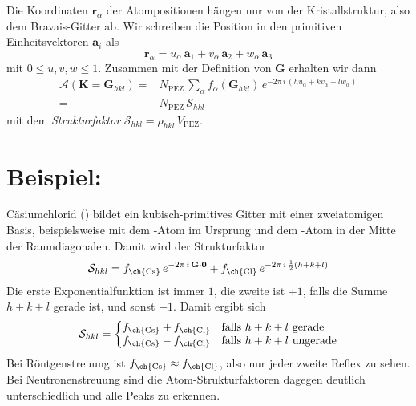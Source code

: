Die Koordinaten  $\mathbf{r}_\alpha$  der Atompositionen hängen nur von der Kristallstruktur, also dem Bravais-Gitter ab. Wir schreiben die Position in den primitiven Einheitsvektoren $\mathbf{a}_i$ als
\begin{equation}
\mathbf{r}_\alpha = u_\alpha \, \mathbf{a}_1 + v_\alpha \, \mathbf{a}_2 + w_\alpha \, \mathbf{a}_3
\end{equation}
mit $0 \le u,v,w \le 1$. Zusammen mit der Definition von  $ \mathbf{G}$ erhalten wir dann 
\begin{align}
\mathcal{A}(\mathbf{K} = \mathbf{G}_{hkl} ) 
 = &
  N_\text{PEZ}  \, 
\sum_\alpha f_\alpha ( \mathbf{G}_{hkl} ) \, e^{-2 \pi \, i \, ( h u_\alpha + k v_\alpha + l w_\alpha  ) } \\
 = &
 N_\text{PEZ} \, \mathcal{S}_{hkl}
\end{align}
mit dem \emph{Strukturfaktor} $\mathcal{S}_{hkl} = \rho_{hkl} \, V_\text{PEZ} $.


\section{Beispiel: }

Cäsiumchlorid  () bildet ein kubisch-primitives Gitter mit einer zweiatomigen Basis, beispielsweise mit dem -Atom im Ursprung und dem -Atom in der Mitte der Raumdiagonalen. Damit wird der Strukturfaktor 
\begin{equation}
\mathcal{S}_{hkl} = f_\text{\ch{Cs}} \, e^{-2 \pi \, i  \, \mathbf{G} \cdot \mathbf{0}} + f_\text{\ch{Cl}} \, e^{- 2 \pi  \, i \, \frac{1}{2}(h + k + l) } 
\end{equation}
Die erste Exponentialfunktion ist immer $1$, die zweite ist $+1$, falls die Summe $h + k + l$ gerade ist, und sonst $-1$. Damit ergibt sich
\begin{equation}
  \mathcal{S}_{hkl} = \left\{
  \begin{array}{@{}ll@{}}
    f_\text{\ch{Cs}}  + f_\text{\ch{Cl}}  &\text{falls}\  h+k+l \ \text{gerade} \\
     f_\text{\ch{Cs}}  - f_\text{\ch{Cl}} & \text{falls}\  h+k+l \ \text{ungerade} \\
  \end{array}\right.
\end{equation} 
Bei Röntgenstreuung ist $  f_\text{\ch{Cs}}  \approx f_\text{\ch{Cl}}$, also nur jeder zweite Reflex zu sehen. Bei Neutronenstreuung sind die Atom-Strukturfaktoren dagegen deutlich unterschiedlich und alle Peaks zu erkennen.



